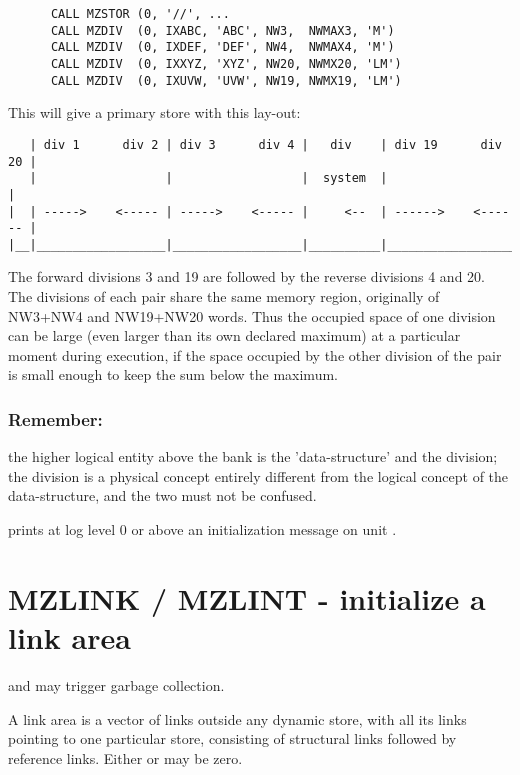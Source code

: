 \Example

\begin{verbatim}
      CALL MZSTOR (0, '//', ...
      CALL MZDIV  (0, IXABC, 'ABC', NW3,  NWMAX3, 'M')
      CALL MZDIV  (0, IXDEF, 'DEF', NW4,  NWMAX4, 'M')
      CALL MZDIV  (0, IXXYZ, 'XYZ', NW20, NWMX20, 'LM')
      CALL MZDIV  (0, IXUVW, 'UVW', NW19, NWMX19, 'LM')
\end{verbatim} 

This will give a primary store with this lay-out:

\begin{verbatim}
   | div 1      div 2 | div 3      div 4 |   div    | div 19      div 20 |
   |                  |                  |  system  |                    |
|  | ----->    <----- | ----->    <----- |     <--  | ------>    <------ |
|__|__________________|__________________|__________|____________________|
\end{verbatim} 

The forward divisions 3 and 19 are followed by the reverse
divisions 4 and 20.
The divisions of each pair share the same memory region,
originally of NW3+NW4 and NW19+NW20 words.
Thus the occupied space of one division can be large
(even larger than its own declared maximum) at a particular
moment during execution,
if the space occupied by the other division of the pair is small
enough to keep the sum below the maximum.

\subsubsection*{Remember:}
the higher logical entity above the bank
is the 'data-structure' and  the division;
the division is a physical concept entirely different
from the logical concept of the data-structure,
and the two must not be confused.

 prints at log level 0 or above
an initialization message on unit .

\section{MZLINK / MZLINT - initialize a link area}

 and  may trigger garbage collection.

A link area is a vector of links outside any dynamic store,
with all its links pointing to one particular store,
consisting of  structural links followed by 
 reference links.
Either  or  may be zero.


